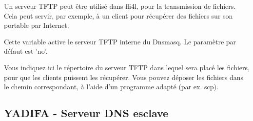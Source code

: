     Un serveur TFTP peut être utilisé dans fli4l, pour la transmission de fichiers.
    Cela peut servir, par exemple, à un client pour récupérer des fichiers sur son
    portable par Internet.

\begin{description}


    Cette variable active le serveur TFTP interne du Dnsmasq.
    Le paramètre par défaut est 'no'.


    Vous indiquez ici le répertoire du serveur TFTP dans lequel sera placé les
    fichiers, pour que les clients puissent les récupérer. Vous pouvez déposer
    les fichiers dans le chemin correspondant, à l'aide d'un programme adapté
    (par ex. scp).
\end{description}


\subsection {YADIFA - Serveur DNS esclave}

